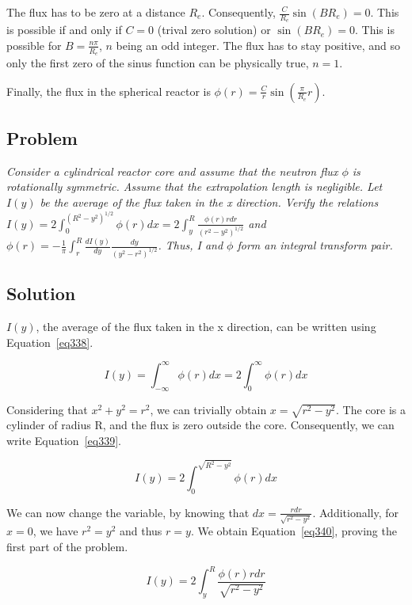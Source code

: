 The flux has to be zero at a distance $R_e$. Consequently, $\frac{C}{R_e}\sin(BR_e) = 0$. This is possible if and only if $C = 0$ (trival zero solution) or $\sin(BR_e) = 0$. This is possible for $B = \frac{n\pi}{R_e}$, $n$ being an odd integer. The flux has to stay positive, and so only the first zero of the sinus function can be physically true, $n = 1$.

Finally, the flux in the spherical reactor is $\phi(r) = \frac{C}{r}\sin(\frac{\pi}{R_e}r)$.


\subsection{Problem}
\textit{Consider a cylindrical reactor core and assume that the neutron flux $\phi$ is rotationally symmetric. Assume that the extrapolation length is negligible. Let $I(y)$ be the average of the flux taken in the x direction. Verify the relations $I(y) = 2 \int_0^{(R^2-y^2)^{1/2}} \phi(r)dx = 2 \int_y^R \frac{\phi(r)rdr}{(r^2-y^2)^{1/2}}$ and $\phi(r) = -\frac{1}{\pi} \int_r^R \frac{dI(y)}{dy} \frac{dy}{(y^2-r^2)^{1/2}}$. Thus, I and $\phi$ form an integral transform pair.}

\subsection{Solution}

$I(y)$, the average of the flux taken in the x direction, can be written using Equation~\ref{eq338}.


\begin{equation}\label{eq338}
I(y) = \int_{-\infty}^{\infty} \phi(r) dx = 2 \int_{0}^{\infty} \phi(r) dx 
\end{equation}

Considering that $x^2 + y^2 = r^2$, we can trivially obtain $x = \sqrt{r^2 - y^2}$. The core is a cylinder of radius R, and the flux is zero outside the core. Consequently, we can write Equation~\ref{eq339}.


\begin{equation}\label{eq339}
I(y) = 2 \int_{0}^{\sqrt{R^2-y^2}} \phi(r) dx
\end{equation}

We can now change the variable, by knowing that $dx = \frac{rdr}{\sqrt{r^2 - y^2}}$. Additionally, for $x = 0$, we have $r^2 = y^2$ and thus $r=y$. We obtain Equation~\ref{eq340}, proving the first part of the problem.


\begin{equation}\label{eq340}
I(y) = 2 \int_{y}^{R} \frac{\phi(r)rdr}{\sqrt{r^2 - y^2}}
\end{equation}

